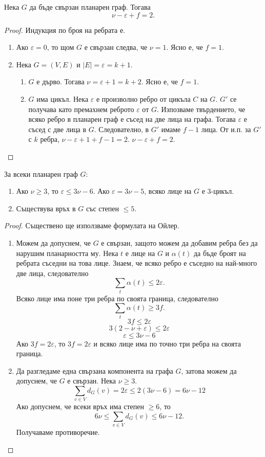 \begin{thm}
  Нека $G$ да бъде свързан планарен граф.
  Тогава \[ \nu - \varepsilon + f = 2 .\]
\end{thm}
\begin{proof}
  Индукция по броя на ребрата $е$.
  \begin{enumerate}
  \item
    Ако $\varepsilon = 0$, то щом $G$ е свързан следва, че $\nu = 1$. Ясно е, че $f = 1$.
  \item
    Нека $G=(V,E)$ и $|E| = \varepsilon = k+1$.
    \begin{enumerate}
    \item
      $G$ е дърво. Тогава $\nu = \varepsilon + 1 = k+2$. Ясно е, че $f = 1$.
    \item
      $G$ има цикъл.  Нека $\varepsilon$ е произволно ребро от цикъла $C$ на $G$.
      $G'$ се получава като премахнем реброто $\varepsilon$ от $G$.
      Изпозваме твърдението, че всяко ребро в планарен граф е съсед на две лица на графа.
      Тогава $\varepsilon$ е съсед с две лица в $G$.
      Следователно, в $G'$ имаме $f-1$ лица.
      От и.п. за $G'$ с $k$ ребра,  $\nu - \varepsilon + 1 + f - 1 = 2$.
      $\nu - \varepsilon + f = 2$.
    \end{enumerate}
  \end{enumerate}
\end{proof}


\begin{thm}
  За всеки планарен граф $G$:
  \begin{enumerate}
  \item
    Ако $\nu\geq 3$, то $\varepsilon\leq 3\nu - 6$.
    Ако $\varepsilon = 3\nu-5$,  всяко лице на $G$ е $3$-цикъл.
  \item
    Съществува връх в $G$ със степен $\leq 5$.
\end{enumerate}
\end{thm}
\begin{proof}
  Съществено ще използваме формулата на Ойлер.
  \begin{enumerate}
  \item
    Можем да допуснем, че $G$ е свързан, защото можем да добавим ребра без да нарушим планарността му.
    Нека $t$ е лице на $G$  и $\alpha(t)$ да бъде броят на ребрата съседни на това лице.
    Знаем, че всяко ребро е съседно на най-много две лица, следователно \[\sum_{t}\alpha(t) \leq 2\varepsilon .\]
    Всяко лице има поне три ребра по своята граница, следователно \[\sum_{t}\alpha(t) \geq 3f .\]
    \[3f \leq 2\varepsilon\]
    \[3(2 - \nu + \varepsilon) \leq 2\varepsilon \]
    \[\varepsilon\leq 3\nu - 6\]
    Ако $3f = 2\varepsilon$, то $3f = 2\varepsilon$ и всяко лице има по точно три ребра на своята граница.
  \item
    Да разгледаме една свързана компонента на графа $G$, затова можем да допуснем, че $G$ е свързан.
    Нека $\nu \geq 3$.
    \[ \sum_{v\in V}d_G(v) = 2\varepsilon \leq 2(3\nu - 6) = 6\nu - 12\]
    Ако допуснем, че всеки връх има степен $\geq 6$, то 
    \[ 6\nu \leq  \sum_{v\in V}d_G(v) \leq 6\nu - 12.\]
    Получаваме противоречие.
\end{enumerate}
\end{proof}


